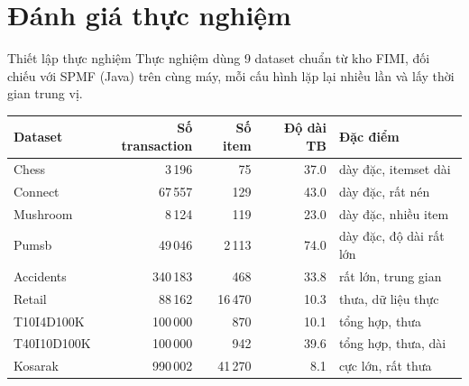 \documentclass[9pt, aspectratio=169]{beamer}
\begin{document}
\section{Đánh giá thực nghiệm}
\begin{frame}{Thiết lập thực nghiệm}
  \small
  Thực nghiệm dùng 9 dataset chuẩn từ kho FIMI, đối chiếu với SPMF (Java)
  trên cùng máy, mỗi cấu hình lặp lại nhiều lần và lấy thời gian trung vị.

  \vspace{0.2cm}
  \centering
  \begin{tabular}{l r r r l}
    \toprule
    \textbf{Dataset} & \textbf{Số transaction} & \textbf{Số item} & \textbf{Độ dài TB} & \textbf{Đặc điểm} \\
    \midrule
    Chess        & 3\,196    & 75      & 37.0 & dày đặc, itemset dài \\
    Connect      & 67\,557   & 129     & 43.0 & dày đặc, rất nén \\
    Mushroom     & 8\,124    & 119     & 23.0 & dày đặc, nhiều item \\
    Pumsb        & 49\,046   & 2\,113  & 74.0 & dày đặc, độ dài rất lớn \\
    Accidents    & 340\,183  & 468     & 33.8 & rất lớn, trung gian \\
    Retail       & 88\,162   & 16\,470 & 10.3 & thưa, dữ liệu thực \\
    T10I4D100K   & 100\,000  & 870     & 10.1 & tổng hợp, thưa \\
    T40I10D100K  & 100\,000  & 942     & 39.6 & tổng hợp, thưa, dài \\
    Kosarak      & 990\,002  & 41\,270 & 8.1  & cực lớn, rất thưa \\
    \bottomrule
  \end{tabular}
\end{frame}
\end{document}
